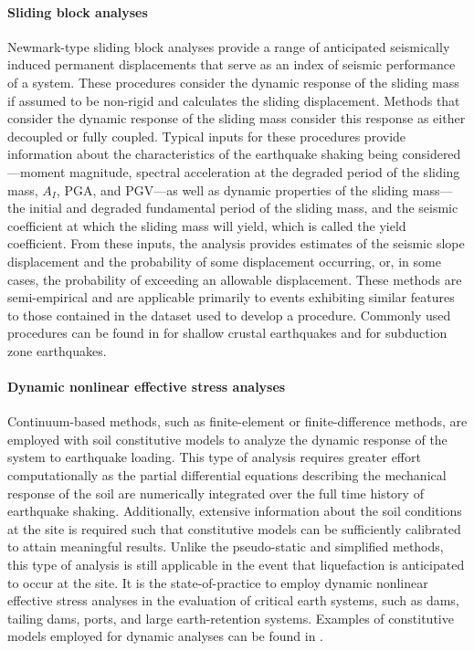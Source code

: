 \paragraph{Sliding block analyses} 
Newmark-type sliding block analyses provide a range of anticipated seismically induced permanent displacements that serve as an index of seismic performance of a system. These procedures consider the dynamic response of the sliding mass if assumed to be non-rigid and calculates the sliding displacement. Methods that consider the dynamic response of the sliding mass consider this response as either decoupled or fully coupled. Typical inputs for these procedures provide information about the characteristics of the earthquake shaking being considered---moment magnitude, spectral acceleration at the degraded period of the sliding mass, $A_I$, PGA, and PGV---as well as dynamic properties of the sliding mass---the initial and degraded fundamental period of the sliding mass, and the seismic coefficient at which the sliding mass will yield, which is called the yield coefficient. From these inputs, the analysis provides estimates of the seismic slope displacement and the probability of some displacement occurring, or, in some cases, the probability of exceeding an allowable displacement. These methods are semi-empirical and are applicable primarily to events exhibiting similar features to those contained in the dataset used to develop a procedure. Commonly used procedures can be found in \citet{makdisi1978simplified, jibson2007regression, bray2007simplified, saygili2008empirical, rathje2014probabilistic, bray2019procedure} for shallow crustal earthquakes and \citet{bray2018simplified} for subduction zone earthquakes.

\paragraph{Dynamic nonlinear effective stress analyses} 
Continuum-based methods, such as finite-element or finite-difference methods, are employed with soil constitutive models to analyze the dynamic response of the system to earthquake loading. This type of analysis requires greater effort computationally as the partial differential equations describing the mechanical response of the soil are numerically integrated over the full time history of earthquake shaking. Additionally, extensive information about the soil conditions at the site is required such that constitutive models can be sufficiently calibrated to attain meaningful results. Unlike the pseudo-static and simplified methods, this type of analysis is still applicable in the event that liquefaction is anticipated to occur at the site. It is the state-of-practice to employ dynamic nonlinear effective stress analyses in the evaluation of critical earth systems, such as dams, tailing dams, ports, and large earth-retention systems. Examples of constitutive models employed for dynamic analyses can be found in \citet{yang2003computational, byrne2004numerical, boulanger2017pm4sand, boulanger2018pm4silt}.


